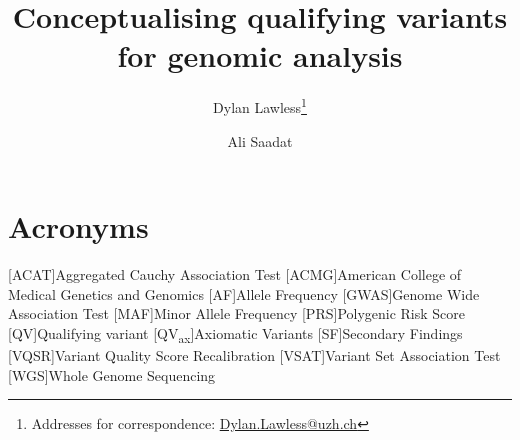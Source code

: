 
\usepackage[printonlyused,withpage,nohyperlinks]{acronym}
% 


\newcommand{\boxlabel}[1]{%
  \refstepcounter{myboxcounter}%
  \label{#1}%
}


\title{Conceptualising qualifying variants for genomic analysis}

\author[1]{Dylan Lawless\thanks{Addresses for correspondence: \href{mailto:Dylan.Lawless@uzh.ch}{Dylan.Lawless@uzh.ch}}}
\author[2]{Ali Saadat}


\maketitle
\justify

\section*{Acronyms}
\renewenvironment{description} %
{\list{}{\labelwidth0pt\itemindent-\leftmargin
    \parsep-1em\itemsep0pt\let\makelabel\descriptionlabel}}
               {\endlist}
\begin{acronym} 
 [ACAT]{Aggregated Cauchy Association Test }
 [ACMG]{American College of Medical Genetics and Genomics}
 [AF]{Allele Frequency}
 [GWAS]{Genome Wide Association Test}
 [MAF]{Minor Allele Frequency}
 [PRS]{Polygenic Risk Score}
 [QV]{Qualifying variant}
 [QV\textsubscript{ax}]{Axiomatic Variants}
  [SF]{Secondary Findings}
 [VQSR]{Variant Quality Score Recalibration}
 [VSAT]{Variant Set Association Test}
 [WGS]{Whole Genome Sequencing}
\end{acronym}
  
